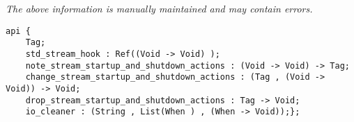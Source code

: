 \label{api:Io\_Startup\_And\_Shutdown}

{\tiny \it The above information is manually maintained and may contain errors.}
\begin{verbatim}
api {
    Tag;
    std_stream_hook : Ref((Void -> Void) );
    note_stream_startup_and_shutdown_actions : (Void -> Void) -> Tag;
    change_stream_startup_and_shutdown_actions : (Tag , (Void -> Void)) -> Void;
    drop_stream_startup_and_shutdown_actions : Tag -> Void;
    io_cleaner : (String , List(When ) , (When -> Void));};
\end{verbatim}
